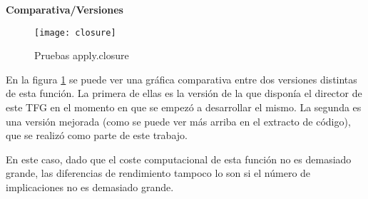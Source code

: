 \newpage

\textbf{Comparativa/Versiones} 

\begin{figure}[H]
    \centering
    \texttt{[image: closure]}
    \caption{Pruebas apply.closure}
    \label{fig:closure}
\end{figure} 

En la figura \ref{fig:closure} se puede ver una gr\'afica comparativa entre dos versiones distintas de esta funci\'on. La primera de ellas es la versi\'on de la que dispon\'ia el director de este TFG en el momento en que se empez\'o a desarrollar el mismo. La segunda es una versi\'on mejorada (como se puede ver m\'as arriba en el extracto de c\'odigo), que se realiz\'o como parte de este trabajo.

En este caso, dado que el coste computacional de esta funci\'on no es demasiado grande, las diferencias de rendimiento tampoco lo son si el n\'umero de implicaciones no es demasiado grande.


